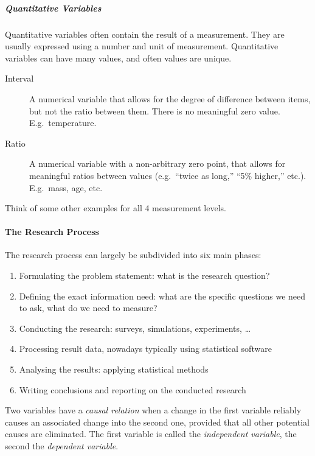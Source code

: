 \subparagraph{Quantitative Variables}

Quantitative variables often contain the result of a measurement.
They are usually expressed using a number and unit of measurement.
Quantitative variables can have many values, and often values are unique.

\begin{description}
    \item [Interval] A numerical variable that allows for the degree of difference between items, but not the ratio between them. There is no meaningful zero value. E.g.~temperature.
    \item [Ratio] A numerical variable with a non-arbitrary zero point, that allows for meaningful ratios between values (e.g.~``twice as long,'' ``5\% higher,'' etc.). E.g.~mass, age, etc.
\end{description}

\begin{exercise}
    Think of some other examples for all 4 measurement levels.
\end{exercise}

\paragraph{The Research Process}

The research process can largely be subdivided into six main phases:

\begin{enumerate}
	\item Formulating the problem statement: what is the research question?
	\item Defining the exact information need: what are the specific questions we need to ask, what do we need to measure?
	\item Conducting the research: surveys, simulations, experiments, \dots
	\item Processing result data, nowadays typically using statistical software
	\item Analysing the results: applying statistical methods
	\item Writing conclusions and reporting on the conducted research
\end{enumerate}

\begin{definition}
    Two variables have a \emph{causal relation} when a change in the first variable reliably causes an associated change into the second one, provided that all other potential causes are eliminated. The first variable is called the \emph{independent variable}, the second the \emph{dependent variable}.
\end{definition}

